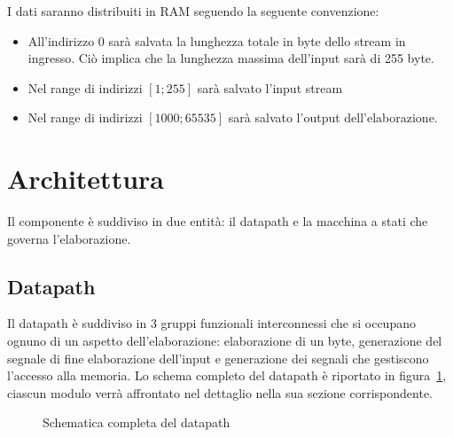 \documentclass[a4paper,11pt]{article}
\begin{document}
I dati saranno distribuiti in RAM seguendo la seguente convenzione:

\begin{itemize}
  \item All'indirizzo 0 sarà salvata la lunghezza totale in byte dello stream in
    ingresso. Ciò implica che la lunghezza massima dell'input sarà di 255 byte.
  \item Nel range di indirizzi $[1;255]$ sarà salvato l'input stream
  \item Nel range di indirizzi $[1000; 65535]$ sarà salvato l'output
    dell'elaborazione.
\end{itemize}

\section{Architettura}

Il componente è suddiviso in due entità: il datapath e la macchina a stati
che governa l'elaborazione.

\subsection{Datapath}

Il datapath è suddiviso in 3 gruppi funzionali interconnessi che si occupano
ognuno di un aspetto dell'elaborazione: elaborazione di un byte, generazione del
segnale di fine elaborazione dell'input e generazione dei segnali che gestiscono
l'accesso alla memoria. Lo schema completo del datapath è riportato in
figura~\ref{fig:datapath}, ciascun modulo verrà affrontato nel dettaglio nella
sua sezione corrispondente.

\begin{figure}
  \centering
  \caption{Schematica completa del datapath}%
  \label{fig:datapath}
\end{figure}
\end{document}
